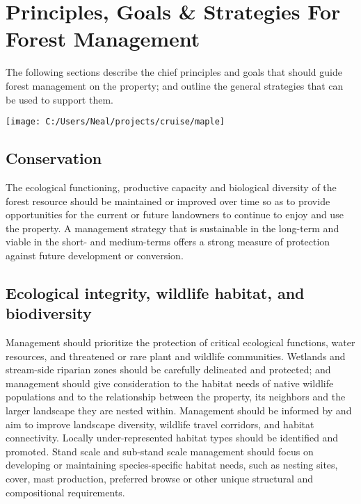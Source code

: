 \documentclass[]{tufte-handout}
\begin{document}
\section{Principles, Goals \& Strategies For Forest
Management}\label{principles-goals-strategies-for-forest-management}

The following sections describe the chief principles and goals that
should guide forest management on the property; and outline the general
strategies that can be used to support them.

\begin{marginfigure}

{\centering \texttt{[image: C:/Users/Neal/projects/cruise/maple]} 

}

\end{marginfigure}

\subsection{Conservation}\label{conservation}

The ecological functioning, productive capacity and biological diversity
of the forest resource should be maintained or improved over time so as
to provide opportunities for the current or future landowners to
continue to enjoy and use the property. A management strategy that is
sustainable in the long-term and viable in the short- and medium-terms
offers a strong measure of protection against future development or
conversion.

\subsection{Ecological integrity, wildlife habitat, and
biodiversity}\label{ecological-integrity-wildlife-habitat-and-biodiversity}

Management should prioritize the protection of critical ecological
functions, water resources, and threatened or rare plant and wildlife
communities. Wetlands and stream-side riparian zones should be carefully
delineated and protected; and management should give consideration to
the habitat needs of native wildlife populations and to the relationship
between the property, its neighbors and the larger landscape they are
nested within. Management should be informed by and aim to improve
landscape diversity, wildlife travel corridors, and habitat
connectivity. Locally under-represented habitat types should be
identified and promoted. Stand scale and sub-stand scale management
should focus on developing or maintaining species-specific habitat
needs, such as nesting sites, cover, mast production, preferred browse
or other unique structural and compositional requirements.
\end{document}
